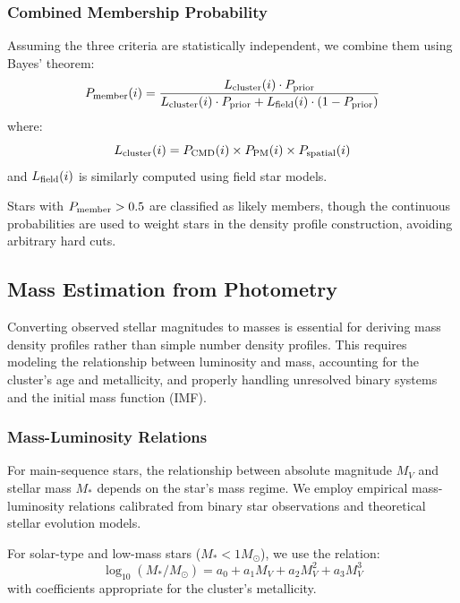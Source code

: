 \documentclass[linenumbers,trackchanges,twocolumn]{aastex701}
\begin{document}
\subsubsection{Combined Membership Probability}

Assuming the three criteria are statistically independent, we combine them using Bayes' theorem:
\begin{equation}
P_{\rm member}(i) = \frac{L_{\rm cluster}(i) \cdot P_{\rm prior}}{L_{\rm cluster}(i) \cdot P_{\rm prior} + L_{\rm field}(i) \cdot (1 - P_{\rm prior})}
\label{eq:combined_membership}
\end{equation}
where:
\begin{equation}
L_{\rm cluster}(i) = P_{\rm CMD}(i) \times P_{\rm PM}(i) \times P_{\rm spatial}(i)
\end{equation}
and $L_{\rm field}(i)$ is similarly computed using field star models.

Stars with $P_{\rm member} > 0.5$ are classified as likely members, though the continuous probabilities are used to weight stars in the density profile construction, avoiding arbitrary hard cuts.

\subsection{Mass Estimation from Photometry} \label{subsec:mass}

Converting observed stellar magnitudes to masses is essential for deriving mass density profiles rather than simple number density profiles. This requires modeling the relationship between luminosity and mass, accounting for the cluster's age and metallicity, and properly handling unresolved binary systems and the initial mass function (IMF).

\subsubsection{Mass-Luminosity Relations}

For main-sequence stars, the relationship between absolute magnitude $M_V$ and stellar mass $M_*$ depends on the star's mass regime. We employ empirical mass-luminosity relations calibrated from binary star observations and theoretical stellar evolution models.

For solar-type and low-mass stars ($M_* < 1 M_\odot$), we use the \citet{henry2004} relation:
\begin{equation}
\log_{10}(M_*/M_\odot) = a_0 + a_1 M_V + a_2 M_V^2 + a_3 M_V^3
\label{eq:mlr_lowmass}
\end{equation}
with coefficients appropriate for the cluster's metallicity.
\end{document}
